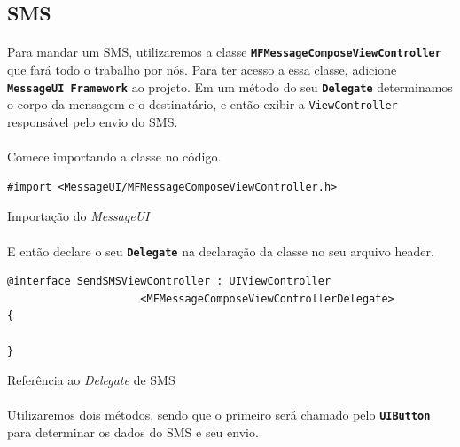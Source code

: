 \documentclass[a4paper,12pt,brazil,doubleside]{book}
\begin{document}
\begin{singlespace}
\section{SMS}

\paragraph{}Para mandar um SMS, utilizaremos a classe \texttt{\textbf{MFMessageComposeViewController}} que fará todo o trabalho por nós. Para ter acesso a essa classe, adicione \texttt{\textbf{MessageUI Framework}} ao projeto. Em um método do seu \texttt{\textbf{Delegate}} determinamos o corpo da mensagem e o destinatário, e então exibir a \texttt{ViewController} responsável pelo envio do SMS.
\paragraph{}Comece importando a classe no código.

\begin{listing}[H]
\begin{verbatim}
#import <MessageUI/MFMessageComposeViewController.h>
\end{verbatim}
\caption{Importação do \emph{MessageUI}}
\end{listing}

\paragraph{}E então declare o seu \texttt{\textbf{Delegate}} na declaração da classe no seu arquivo header.

\begin{listing}[H]
\begin{verbatim}
@interface SendSMSViewController : UIViewController
                     <MFMessageComposeViewControllerDelegate>
{
	
}
\end{verbatim}
\caption{Referência ao \emph{Delegate} de SMS}
\end{listing}

\paragraph{}Utilizaremos dois métodos, sendo que o primeiro será chamado pelo \texttt{\textbf{UIButton}} para determinar os dados do SMS e seu envio.


\end{singlespace}
\end{document}
